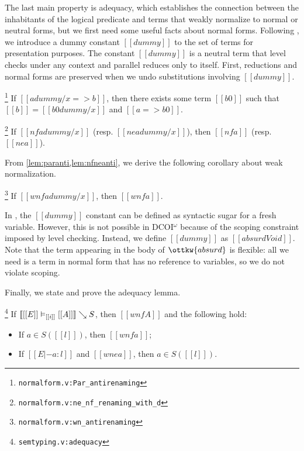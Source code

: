 \documentclass[acmsmall, screen=true, nonacm=true,
  review=\ifpublic false\else true\fi,
  anonymous=\ifanonymous true\else false\fi
]{acmart}
\makeatletter
\DeclarePairedDelimiter{\bracks}{\llbracket}{\rrbracket}
\newcommand{\name}{\texorpdfstring{DCOI$^{\omega}$\@\xspace}{DCOI-omega}}
\newcommand{\suppl}[3]{{\scriptsize\texttt{#2:#3}}}
\newcommand{\interp}[4]{\bracks{#1 \vDash_{#2} #3} \searrow #4}
\newcommand{\member}[3]{#1 \in #3(#2)}
\newlength{\punctwidth}
\newcommand{\stack}[1]{%
  \settowidth{\punctwidth}{#1}%
  \hspace*{-\the\punctwidth}%
}
\makeatother
\begin{document}
The last main property is adequacy,
which establishes the connection between the inhabitants of
the logical predicate and terms that weakly normalize to normal or
neutral forms, but we first need some
useful facts about normal forms. Following \citet{geuvers:cc-sn}, we
introduce a dummy constant $[[dummy]]$ to the set of
terms for presentation purposes. The constant $[[dummy]]$ is a neutral
term that level checks under any context and parallel reduces only to itself.
First, reductions and normal forms are preserved when we undo substitutions
involving $[[dummy]]$.

\begin{lemma}
  \stack{.~}\footnote{\suppl{theories}{normalform.v}{Par\_antirenaming}}
  \label{lem:paranti}
  If $[[a {dummy / x} => b]]$, then there exists some term $[[b0]]$
  such that $[[b]] = [[b0 {dummy / x}]]$ and $[[a => b0]]$.
\end{lemma}

\begin{lemma}
  \stack{.~}\footnote{\suppl{theories}{normalform.v}{ne\_nf\_renaming\_with\_d}}
  \label{lem:nfneanti}
  If $[[nf a {dummy / x}]]$ (resp. $[[ne a {dummy / x}]]$), then $[[nf
  a]]$ (resp. $[[ne a]]$).
\end{lemma}

From \cref{lem:paranti,lem:nfneanti}, we derive the
following corollary about weak normalization.

\begin{lemma}
  \stack{.~}\footnote{\suppl{theories}{normalform.v}{wn\_antirenaming}}
  \label{lem:wnanti}
  If $[[wnf a {dummy / x}]]$, then $[[wnf a]]$.
\end{lemma}

In \citet{geuvers:cc-sn}, the $[[dummy]]$ constant can be defined as
syntactic sugar for a fresh variable. However, this is not possible in \name
because of the scoping constraint imposed by level checking. Instead, we define
$[[dummy]]$ as $[[absurd Void]]$. Note that the term appearing in the body of $\ottkw{absurd}$
is flexible: all we need is a term in normal form 
that has no reference to variables, so we do not violate scoping.

Finally, we state and prove the adequacy lemma.

\begin{lemma}[Adequacy]
  \stack{.~}\footnote{\suppl{theories}{semtyping.v}{adequacy}}
  \label{lem:adequacy}
  If $\interp{[[E]]}{[[i]]}{[[A]]}{S}$, then $[[wnf A]]$ and the following hold:
  \begin{itemize}
  \item If $\member{a}{[[l]]}{S}$, then $[[wnf a]]$;
  \item If $[[E |- a : l]]$ and $[[wne a]]$, then $\member{a}{[[l]]}{S}$.
  \end{itemize}
\end{lemma}
\end{document}
